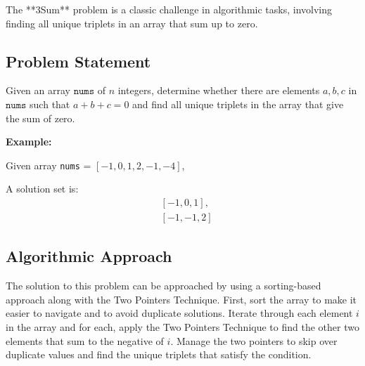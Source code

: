 
\label{problem:3Sum}

The **3Sum** problem is a classic challenge in algorithmic tasks, involving finding all unique triplets in an array that sum up to zero.

\subsection*{Problem Statement}
Given an array \( \texttt{nums} \) of \( n \) integers, determine whether there are elements \( a, b, c \) in \( \texttt{nums} \) such that \( a + b + c = 0 \) and find all unique triplets in the array that give the sum of zero.

\textbf{Example:}

Given array \texttt{nums} = \([-1, 0, 1, 2, -1, -4]\),

A solution set is:
\[
\begin{aligned}
  &[-1, 0, 1], \\
  &[-1, -1, 2]
\end{aligned}
\]

\subsection*{Algorithmic Approach}
The solution to this problem can be approached by using a sorting-based approach along with the Two Pointers Technique. First, sort the array to make it easier to navigate and to avoid duplicate solutions. Iterate through each element \( i \) in the array and for each, apply the Two Pointers Technique to find the other two elements that sum to the negative of \( i \). Manage the two pointers to skip over duplicate values and find the unique triplets that satisfy the condition.



